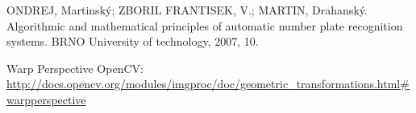 
\begin{thebibliography}{99}


 ONDREJ, Martinský; ZBORIL FRANTISEK, V.; MARTIN, Drahanský. 
Algorithmic and mathematical principles of automatic number plate recognition systems. 
BRNO University of technology, 2007, 10.


 Warp Perspective OpenCV:\\
  \url{http://docs.opencv.org/modules/imgproc/doc/geometric_transformations.html#warpperspective}

\end{thebibliography}

\vfill
